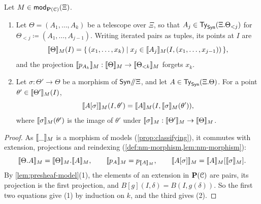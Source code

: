 \begin{lemma}\label{lem:points-extension}
    Let $M \in \mathsf{mod}_{\mathbf{P}(\mathcal{C})}(\Xi)$.
    \begin{enumerate}
        \item Let $\Theta = (A_1, \ldots, A_k)$ be a telescope over $\Xi$, so that $A_j \in \mathsf{Ty}_{\mathsf{Syn}}(\Xi.\Theta_{<j})$ for $\Theta_{<j} \coloneqq (A_1, \ldots, A_{j-1})$. Writing iterated pairs as tuples, its points at $I$ are
        \[
            \llbracket\Theta\rrbracket_M(I) = \{\, (x_1, \ldots, x_k) \mid x_j \in \llbracket A_j\rrbracket_M(I, (x_1, \ldots, x_{j-1})) \,\},
        \]
        and the projection $\llbracket p_{A_k}\rrbracket_M : \llbracket\Theta\rrbracket_M \to \llbracket\Theta_{<k}\rrbracket_M$ forgets $x_k$.
        \item Let $\sigma : \Theta' \to \Theta$ be a morphism of $\mathsf{Syn}\mathord{/\mkern-5mu/}\Xi$, and let $A \in \mathsf{Ty}_{\mathsf{Syn}}(\Xi.\Theta)$. For a point $\theta' \in \llbracket\Theta'\rrbracket_M(I)$,
        \[
            \llbracket A[\sigma]\rrbracket_M(I, \theta') = \llbracket A\rrbracket_M(I, \llbracket\sigma\rrbracket_M(\theta')),
        \]
        where $\llbracket\sigma\rrbracket_M(\theta')$ is the image of $\theta'$ under $\llbracket\sigma\rrbracket_M : \llbracket\Theta'\rrbracket_M \to \llbracket\Theta\rrbracket_M$.
    \end{enumerate}
\end{lemma}

\begin{proof}
    As $\llbracket\_\rrbracket_M$ is a morphism of models (\cref{prop:classifying}), it commutes with extension, projections and reindexing (\cref{def:nm-morphism,lem:nm-morphism}):
    \[
        \llbracket\Theta.A\rrbracket_M = \llbracket\Theta\rrbracket_M.\llbracket A\rrbracket_M, \qquad \llbracket p_A\rrbracket_M = p_{\llbracket A\rrbracket_M}, \qquad \llbracket A[\sigma]\rrbracket_M = \llbracket A\rrbracket_M[\llbracket\sigma\rrbracket_M].
    \]
    By \cref{lem:presheaf-model}(1), the elements of an extension in $\mathbf{P}(\mathcal{C})$ are pairs, its projection is the first projection, and $B[g](I, \delta) = B(I, g(\delta))$. So the first two equations give (1) by induction on $k$, and the third gives (2).
\end{proof}

